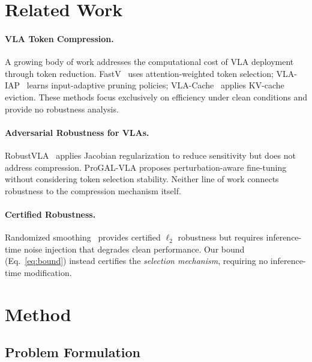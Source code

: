 \documentclass[conference]{corl_2026}
\begin{document}
\section{Related Work}
\label{sec:related}

\paragraph{VLA Token Compression.}
A growing body of work addresses the computational cost of VLA deployment through token reduction. FastV~\cite{fastv} uses attention-weighted token selection; VLA-IAP~\cite{vlaiap} learns input-adaptive pruning policies; VLA-Cache~\cite{vlacache} applies KV-cache eviction. These methods focus exclusively on efficiency under clean conditions and provide no robustness analysis.

\paragraph{Adversarial Robustness for VLAs.}
RobustVLA~\cite{robustvla} applies Jacobian regularization to reduce sensitivity but does not address compression. ProGAL-VLA proposes perturbation-aware fine-tuning without considering token selection stability. Neither line of work connects robustness to the compression mechanism itself.

\paragraph{Certified Robustness.}
Randomized smoothing~\cite{cohen2019certified} provides certified $\ell_2$ robustness but requires inference-time noise injection that degrades clean performance. Our bound (Eq.~\ref{eq:bound}) instead certifies the \emph{selection mechanism}, requiring no inference-time modification.

\section{Method}
\label{sec:method}

\subsection{Problem Formulation}
\end{document}
